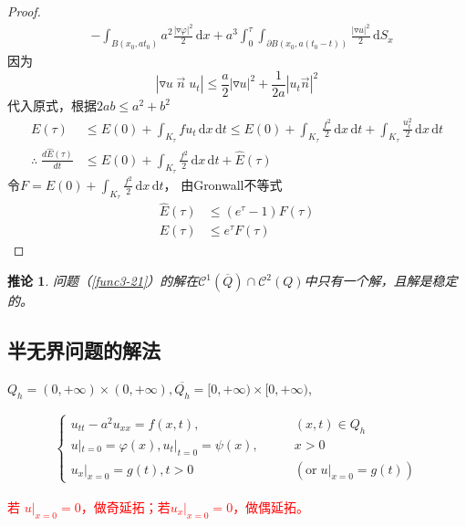 \documentclass[11pt, a4paper]{article}
\theoremstyle{theorem}
\newtheorem{cor}[thm]{推论}
\newcommand{\intd}[1]{\,\mathrm{d}{#1}}
\begin{document}
\begin{proof}
\begin{align*}
    &- \int_{B(x_0, at_0)} a^2 \frac{|\triangledown \varphi|^2}{2} \intd x  +  a^3 \int_0^\tau  \int_{\partial B(x_0, a(t_0 - t))} \frac{|\triangledown u|^2}{2} \intd S_x
\end{align*}
因为
$$
|\triangledown u \; \vec{n} \; u_t| \leq \frac{a}{2} |\triangledown u|^2 + \frac{1}{2a} |u_t \vec{n}|^2
$$
代入原式，根据$2ab \leq a^2 + b^2$
\begin{align*}
    E(\tau) &\leq E(0) + \int_{K_\tau}f u_t \intd x \intd t \leq E(0) + \int_{K_\tau} \frac{f^2}{2} \intd x \intd t + \int_{K_\tau} \frac{u_t^2}{2} \intd x \intd t \\
    \therefore \; \frac{d \hat{E}(\tau)}{d t} &\leq E(0) + \int_{K_\tau} \frac{f^2}{2} \intd x \intd t + \hat{E}(\tau)
\end{align*}
令$F = E(0) + \int_{K_\tau} \frac{f^2}{2} \intd x \intd t$， 由Gronwall不等式
\begin{align}
    \hat{E}(\tau) &\leq (e^\tau - 1)F(\tau) \\
    E(\tau) &\leq e^\tau F(\tau)
\end{align}
\end{proof}

\begin{cor}
问题（\ref{func3-21}）的解在$\mathcal{C}^1(\overline{Q}) \cap \mathcal{C}^2(Q)$中只有一个解，且解是稳定的。
\end{cor}

\subsection{半无界问题的解法}

$Q_h = (0, +\infty) \times (0, +\infty), \overline{Q_h} = [0, +\infty) \times [0, +\infty)$,

\begin{align}
\label{func3-30}
    \begin{cases}
    u_{tt} - a^2 u_{xx} = f(x,t), \quad \quad &(x,t) \in Q_h \\
    u|_{t = 0} = \varphi(x), u_t|_{t = 0} = \psi(x), \quad \quad &x > 0 \\
    u_x|_{x = 0} = g(t), t > 0 \quad &\left(\text{or} \; u|_{x=0} = g(t)\right)
    \end{cases}
\end{align}

\textcolor{red}{若 $u|_{x = 0} = 0$，做奇延拓；若$u_x|_{x=0} = 0$，做偶延拓。}
\end{document}

